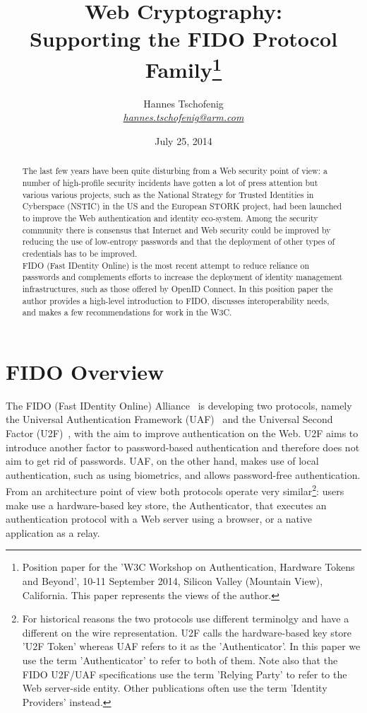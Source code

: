 \documentclass[peerreview, a4paper, 7pt]{IEEEtran}
\title{Web Cryptography: \\Supporting the FIDO Protocol Family\thanks{Position paper for the 'W3C Workshop on Authentication, Hardware Tokens and Beyond', 10-11 September 2014, Silicon Valley (Mountain View), California. This paper represents the views of the author.}}
\author{Hannes Tschofenig\\\textit{\href{mailto:hannes.tschofenig@arm.com}{hannes.tschofenig@arm.com}}}
\date{July 25, 2014}
\begin{document}
\maketitle


\begin{abstract}

The last few years have been quite disturbing from a Web security point of view: a number of high-profile security incidents have gotten a lot
of press attention but various various projects, such as the National Strategy for Trusted Identities in Cyberspace (NSTIC) in the US and the 
European STORK project, had been launched to improve the Web authentication and identity eco-system. Among the security community there is 
consensus that Internet and Web security could be improved by reducing the use of low-entropy passwords and that the deployment of other 
types of credentials has to be improved. \\

FIDO (Fast IDentity Online) is the most recent attempt to reduce reliance on passwords and complements efforts to increase the deployment of 
identity management infrastructures, such as those offered by OpenID Connect. In this position paper the author provides a high-level 
introduction to FIDO, discusses interoperability needs, and makes a few recommendations for work in the W3C. 

\end{abstract}

\section{FIDO Overview}

The FIDO (Fast IDentity Online) Alliance~\cite{fido} is developing two protocols, namely the Universal Authentication Framework (UAF)~\cite{uaf} and the Universal Second Factor (U2F)~\cite{u2f}, with the aim to improve authentication on the Web. U2F aims to introduce another factor to password-based authentication and therefore does not aim to get rid of passwords. UAF, on the other hand, makes use of local authentication, such as using biometrics, and allows password-free authentication. From an architecture point of view both protocols operate very similar\footnote{For historical reasons the two protocols use different terminolgy and have a different on the wire representation. U2F calls the hardware-based key store 'U2F Token' whereas UAF refers to it as the 'Authenticator'. In this paper we use the term 'Authenticator' to refer to both of them. Note also that the FIDO U2F/UAF specifications use the term 'Relying Party' to refer to the Web server-side entity. Other publications often use the term 'Identity Providers' instead.}: users make use a hardware-based key store, the Authenticator, that executes an authentication protocol with a Web server using a browser, or a native application as a relay. 
\end{document}
